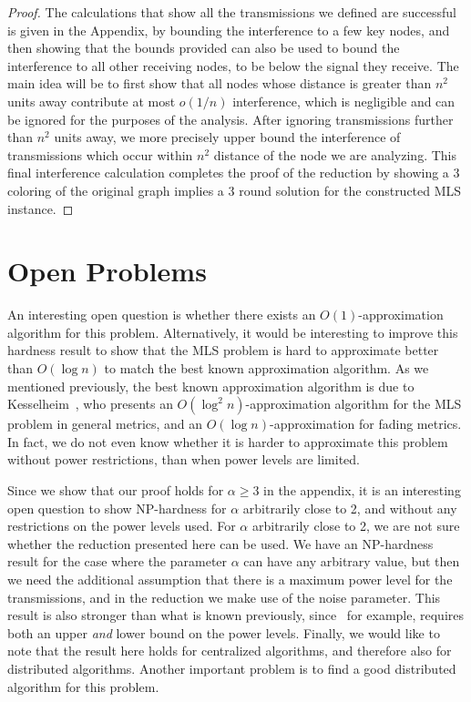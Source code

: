 \documentclass{article}
\begin{document}
\begin{proof}
The calculations that show all the transmissions we defined are successful is given in the Appendix, by bounding the interference to a few key nodes, and then showing that the bounds provided can also be used to bound the interference to all other receiving nodes, to be below the signal they receive.  The main idea will be to first show that all nodes whose distance is greater than $n^2$ units away contribute at most $o(1/n)$ interference, which is negligible and can be ignored for the purposes of the analysis.  After ignoring transmissions further than $n^2$ units away, we more precisely upper bound the interference of transmissions which occur within $n^2$ distance of the node we are analyzing.  This final interference calculation completes the proof of the reduction by showing a 3 coloring of the original graph implies a 3 round solution for the constructed MLS instance.
\end{proof}





\section{Open Problems}
\label{sec:openproblems}
An interesting open question is whether there exists an $O( 1 )$-approximation algorithm for this problem.  Alternatively, it would be interesting to improve this hardness result to show that the MLS problem is hard to approximate better than $O( \log n)$ to match the best known approximation algorithm.  As we mentioned previously, the best known approximation algorithm is due to Kesselheim~\cite{K11}, who presents an $O( \log^2 n )$-approximation algorithm for the MLS problem in general metrics, and an $O( \log n )$-approximation for fading metrics.  In fact, we do not even know whether it is harder to approximate this problem without power restrictions, than when power levels are limited.

Since we show that our proof holds for $\alpha \geq 3$ in the appendix, it is an interesting open question to show NP-hardness for $\alpha$ arbitrarily close to 2, and without any restrictions on the power levels used. For $\alpha$ arbitrarily close to 2, we are not sure whether the reduction presented here can be used.  We have an NP-hardness result for the case where the parameter $\alpha$ can have any arbitrary value, but then we need the additional assumption that there is a maximum power level for the transmissions, and in the reduction we make use of the noise parameter.  This result is also stronger than what is known previously, since~\cite{KVW10} for example, requires both an upper {\it and} lower bound on the power levels.  Finally, we would like to note that the result here holds for centralized algorithms, and therefore also for distributed algorithms.  Another important problem is to find a good distributed algorithm for this problem.
\end{document}
